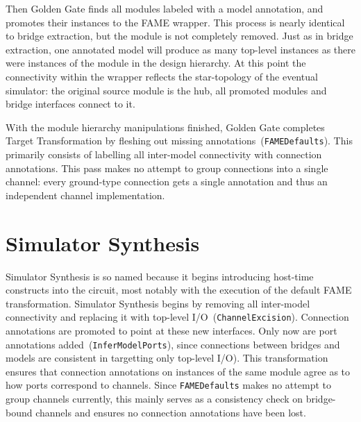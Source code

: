 Then Golden Gate finds all modules labeled with a model annotation, and
promotes their instances to the FAME wrapper. This process is nearly identical
to bridge extraction, but the module is not completely removed. Just as in
bridge extraction, one annotated model will produce as many top-level instances
as there were instances of the module in the design hierarchy.  At this point
the connectivity within the wrapper reflects the star-topology of the eventual
simulator: the original source module is the hub, all promoted modules and
bridge interfaces connect to it.

With the module hierarchy manipulations finished, Golden Gate completes Target
Transformation by fleshing out missing annotations~(\texttt{FAMEDefaults}). This primarily consists of labelling
all inter-model connectivity with connection annotations. This pass makes no
attempt to group connections into a single channel: every ground-type
connection gets a single annotation and thus an independent channel implementation.

\section{Simulator Synthesis}

Simulator Synthesis is so named because it begins introducing host-time constructs into the circuit,
most notably with the execution of the default FAME transformation. Simulator
Synthesis begins by removing all inter-model connectivity and replacing it
with top-level I/O~(\texttt{ChannelExcision}). Connection annotations are
promoted to point at these new interfaces. Only now are port annotations
added~(\texttt{InferModelPorts}), since connections between bridges and models
are consistent in targetting only top-level I/O).  This transformation
ensures that connection annotations on instances of the same module agree as to how
ports correspond to channels. Since \texttt{FAMEDefaults} makes no attempt to
group channels currently, this mainly serves as a consistency check on
bridge-bound channels and ensures no connection annotations have been lost.

